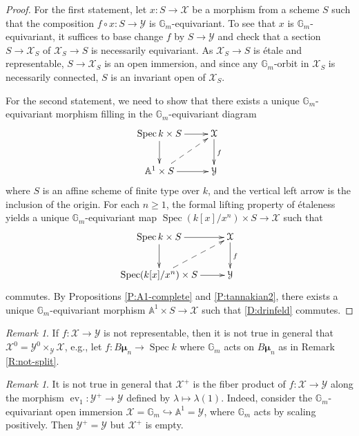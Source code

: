 \documentclass[a4paper]{amsart}
\theoremstyle{plain}
\theoremstyle{definition}
\theoremstyle{remark}
\newtheorem{remark}[theorem]{Remark}
\numberwithin{equation}{section}
\newcommand{\GG}{\mathbb{G}}
\renewcommand\AA{\mathbb{A}}
\newcommand\cX{\mathcal{X}}
\newcommand\cY{\mathcal{Y}}
\newcommand\co{\colon}
\DeclareMathOperator{\Spec}{Spec}
\DeclareMathOperator{\ev}{ev}
\newcommand{\Gmu}{\pmb{\mu}}
\begin{document}
\begin{proof}
  For the first statement, let $x \co S \to \cX$ be a morphism from a scheme $S$ such that the composition $f \circ x \co S \to \cY$ is $\GG_m$-equivariant.  To see that $x$ is $\GG_m$-equivariant, it suffices to base change $f$ by $S \to \cY$ and check that a section $S \to \cX_S$ of $\cX_S \to S$ is necessarily equivariant.  As $\cX_S \to S$ is \'etale and representable, $S \to \cX_S$ is an open immersion, and since any $\GG_m$-orbit in $\cX_S$ is necessarily connected, $S$ is an invariant open of  $\cX_S$.
  
For the second statement,
we need to show that there exists a unique $\GG_m$-equivariant morphism filling in the $\GG_m$-equivariant
diagram
\begin{equation} \label{D:drinfeld}
\begin{split}
\xymatrix{
\Spec k \times S \ar[r] \ar[d]				& \cX \ar[d]^f \\
\AA^1 \times S	\ar[r]	\ar@{-->}[ur]			& \cY
} \end{split} \end{equation}
where $S$ is an affine scheme of finite type over $k$, and the vertical left arrow is the inclusion of the origin.  For each $n \ge 1$, the formal lifting property of \'etaleness yields a unique $\GG_m$-equivariant map $\Spec(k[x]/x^n) \times S \to \cX$ such that 
$$\xymatrix{
\Spec k \times S \ar[r] \ar[d]				& \cX \ar[d]^f \\
\Spec (k[x]/x^n) \times S	\ar[r]	\ar@{-->}[ur]			& \cY
}$$
commutes.   By Propositions \ref{P:A1-complete} and \ref{P:tannakian2}, there exists a unique $\GG_m$-equivariant morphism $\AA^1 \times S \to \cX$ such that \eqref{D:drinfeld} commutes.
\end{proof}

\begin{remark} If $f \co \cX \to \cY$ is not representable, then it is not true in general that $\cX^0 = \cY^0 \times_{\cY} \cX$, e.g., let $f \co B\Gmu_n\to \Spec k$ where $\GG_m$ acts on $B \Gmu_n$ as in Remark \ref{R:not-split}. 
\end{remark}

\begin{remark} It is not true in general that $\cX^+$ is the fiber product of $f \co \cX \to \cY$ along the morphism $\ev_1 \co \cY^+ \to \cY$ defined by $\lambda \mapsto \lambda(1)$.    Indeed, consider the $\GG_m$-equivariant open immersion $\cX=\GG_m \hookrightarrow \AA^1=\cY$, where $\GG_m$ acts by scaling positively.  Then $\cY^+ = \cY$ but $\cX^+$ is empty.  \end{remark}
\end{document}
